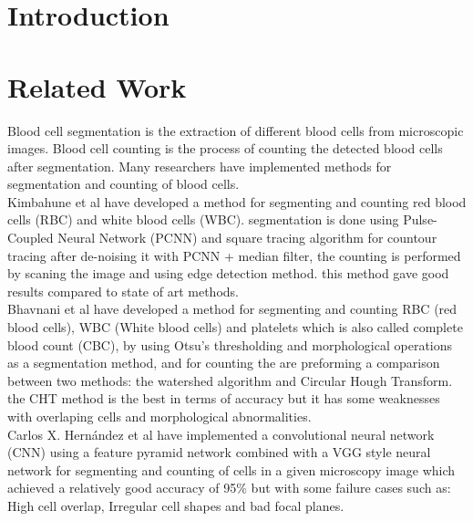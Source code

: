 \section{Introduction}
\vspace{0.2in}
\hspace*{0.16in}

\section{Related Work}
\vspace{0.2in}
\hspace*{0.16in}
Blood cell segmentation is the extraction of different blood cells from microscopic images. Blood cell counting is the process of counting the detected blood cells after segmentation. Many researchers have implemented methods for segmentation and counting of blood cells.\\

Kimbahune et al \textsuperscript{\cite{kimbahune2011blood}} have developed a method for segmenting and counting red blood cells (RBC) and white blood cells (WBC).
segmentation is done using Pulse-Coupled Neural Network (PCNN) and square tracing algorithm for countour tracing after de-noising it with PCNN + median filter, the counting is performed by scaning the image and using edge detection method. this method gave good results compared to state of art methods.\\

Bhavnani et al \textsuperscript{\cite{bhavnani2016segmentation}} have developed a method for segmenting and counting RBC (red blood cells), WBC (White blood cells) and platelets which is also called complete blood count (CBC), by using Otsu’s thresholding and morphological operations as a segmentation method, and for counting the are preforming a comparison between two methods: the watershed algorithm and Circular Hough Transform. the CHT method is the best in terms of accuracy but it has some weaknesses with overlaping cells and morphological abnormalities.\\

Carlos X. Hern{\'{a}}ndez et al \textsuperscript{\cite{DBLP:journals/corr/abs-1802-10548}} have implemented a convolutional neural network (CNN) using a feature pyramid network combined with a VGG style neural network for segmenting and counting of cells in a given microscopy image which achieved a relatively good accuracy of 95\% but with some failure cases such as: High cell overlap, Irregular cell shapes and bad focal planes.\\

